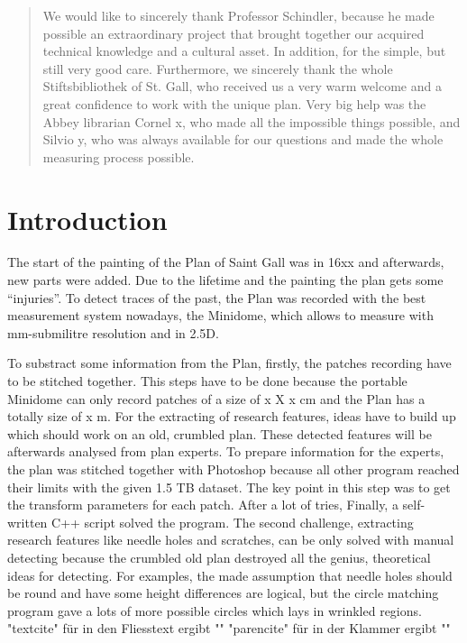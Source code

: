 \documentclass[a4paper,twoside,11pt,openright,table,draft]{article} %
\begin{document}
\renewcommand{\abstractname}{Acknowledgements}
\begin{abstract}
\noindent We would like to sincerely thank Professor Schindler, because he made possible an extraordinary project that brought together our acquired technical knowledge and a cultural asset. In addition, for the simple, but still very good care. Furthermore, we sincerely thank the whole Stiftsbibliothek of St. Gall, who received us a very warm welcome and a great confidence to work with the unique plan. Very big help was the Abbey librarian Cornel x, who made all the impossible things possible, and Silvio y, who was always available for our questions and made the whole measuring process possible.\\
\end{abstract}
\cleardoublepage

\restoregeometry

\tableofcontents
\clearpage

\listoffigures
\listoftables
\cleardoublepage

\pagestyle{headings}
\renewcommand{\subsectionmark}[1]{\markright{\thesubsection\ #1}}

\layout %

\section{Introduction}
\setcounter{page}{1}
The start of the painting of the Plan of Saint Gall was in 16xx and afterwards, new parts were added. Due to the lifetime and the painting the plan gets some “injuries”. To detect traces of the past, the Plan was recorded with the best measurement system nowadays, the Minidome, which allows to measure with mm-submilitre resolution and in 2.5D. 

To substract some information from the Plan, firstly, the patches recording have to be stitched together. This steps have to be done because the portable Minidome can only record patches of a size of x X x cm and the Plan has a totally size of  x m. For the extracting of research features, ideas have to build up which should work on an old, crumbled plan. These detected features will be afterwards analysed from plan experts. 
To prepare information for the experts, the plan was stitched together with Photoshop because all other program reached their limits with the given 1.5 TB dataset. The key point in this step was to get the transform parameters for each patch. After a lot of tries, Finally, a self-written C++ script solved the program. The second challenge, extracting research features like needle holes and scratches, can be only solved with manual detecting because the crumbled old plan destroyed all the genius, theoretical ideas for detecting. For examples, the made assumption that needle holes should be round and have some height differences are logical, but the circle matching program gave a lots of more possible circles which lays in wrinkled regions.
 \\
"textcite{}" für in den Fliesstext ergibt "\textcite{Dobbertin2005}" \newline
"parencite{}" für in der Klammer ergibt "\parencite{Dobbertin2005}"
\end{document}
